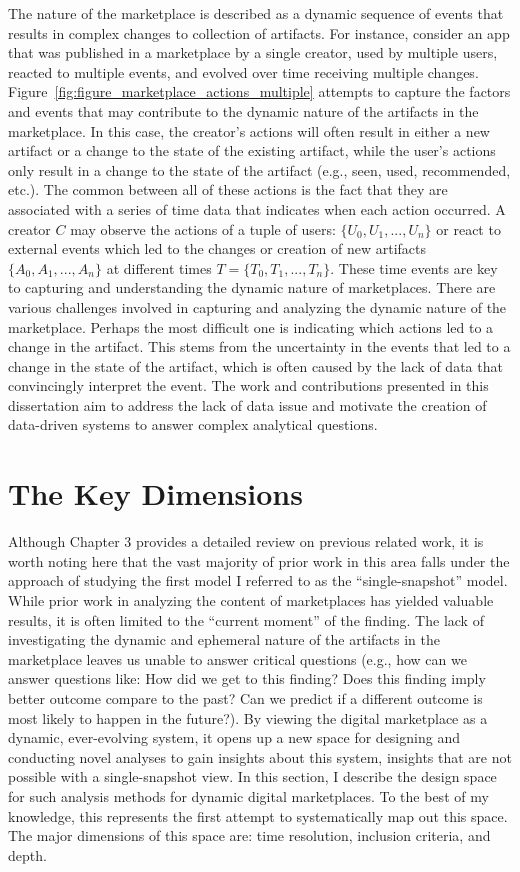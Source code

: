 The nature of the marketplace is described as a dynamic sequence of events that results in complex changes to collection of artifacts.
For instance, consider an app that was published in a marketplace by a single creator, used by multiple users, reacted to multiple events, and evolved over time receiving multiple changes.
Figure~\ref{fig:figure_marketplace_actions_multiple} attempts to capture the factors and events that may contribute to the dynamic nature of the artifacts in the marketplace.
In this case, the creator's actions will often result in either a new artifact or a change to the state of the existing artifact, while the user's actions only result in a change to the state of the artifact (e.g., seen, used, recommended, etc.).
The common between all of these actions is the fact that they are associated with a series of time data that indicates when each action occurred.
A creator $C$ may observe the actions of a tuple of users: $\{U_0, U_1,..., U_n\}$ or react to external events which led to the changes or creation of new artifacts $\{A_0, A_1,..., A_n\}$ at different times $T=\{T_0, T_1,..., T_n\}$.
These time events are key to capturing and understanding the dynamic nature of marketplaces.
There are various challenges involved in capturing and analyzing the dynamic nature of the marketplace.
Perhaps the most difficult one is indicating which actions led to a change in the artifact.
This stems from the uncertainty in the events that led to a change in the state of the artifact, which is often caused by the lack of data that convincingly interpret the event.
The work and contributions presented in this dissertation aim to address the lack of data issue and motivate the creation of data-driven systems to answer complex analytical questions. 

\section{The Key Dimensions}
Although Chapter 3 provides a detailed review on previous related work, it is worth noting here that the vast majority of prior work in this area falls under the approach of studying the first model I referred to as the ``single-snapshot'' model.
While prior work in analyzing the content of marketplaces has yielded valuable results, it is often limited to the ``current moment'' of the finding.
The lack of investigating the dynamic and ephemeral nature of the artifacts in the marketplace leaves us unable to answer critical questions (e.g., how can we answer questions like: How did we get to this finding? Does this finding imply better outcome compare to the past? Can we predict if a different outcome is most likely to happen in the future?).
By viewing the digital marketplace as a dynamic, ever-evolving system, it opens up a new space for designing and conducting novel analyses to gain insights about this system, insights that are not possible with a single-snapshot view.
In this section, I describe the design space for such analysis methods for dynamic digital marketplaces.
To the best of my knowledge, this represents the first attempt to systematically map out this space.
The major dimensions of this space are: time resolution, inclusion criteria, and depth.

